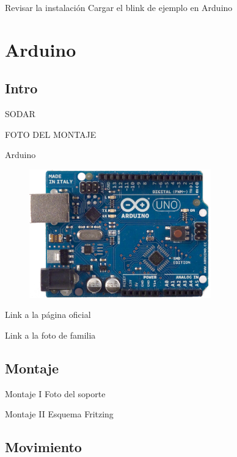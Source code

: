 \documentclass{beamer}
\begin{document}
\begin{frame}{Revisar la instalación}
  Cargar el blink de ejemplo en Arduino
\end{frame}

\section{Arduino}
\subsection{Intro}
\begin{frame}{SODAR}

FOTO DEL MONTAJE
  
\end{frame}

\begin{frame}{Arduino}

  \begin{figure}
    \centering
    \includegraphics [width=0.7\textwidth]{ArduinoUnoSmd.jpg}
  \end{figure}


  Link a la página oficial

  Link a la foto de familia
\end{frame}

\subsection{Montaje}
\begin{frame}{Montaje I}
  Foto del soporte
\end{frame}

\begin{frame}{Montaje II}
  Esquema Fritzing
\end{frame}

\subsection{Movimiento}
\end{document}
